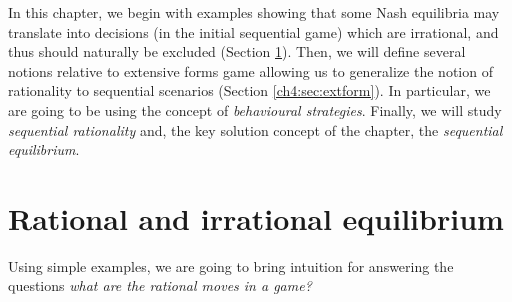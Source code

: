 In this chapter, we begin with examples showing that
some Nash equilibria may translate into decisions (in the initial sequential game) which are irrational, and thus should naturally be excluded (Section \ref{ch4:sec:motivations}). Then, we will define several notions relative to extensive forms game allowing us to generalize the notion of rationality to sequential scenarios (Section \ref{ch4:sec:extform}). In particular, we are going to be using the concept of \emph{behavioural strategies}. Finally, we will study  \emph{sequential rationality} and,  the key solution concept of the chapter, the \emph{sequential equilibrium}.





\section{Rational and irrational equilibrium}
\label{ch4:sec:motivations}
Using simple examples, we are going to bring intuition for answering the questions \emph{what are the rational moves in a game?}

